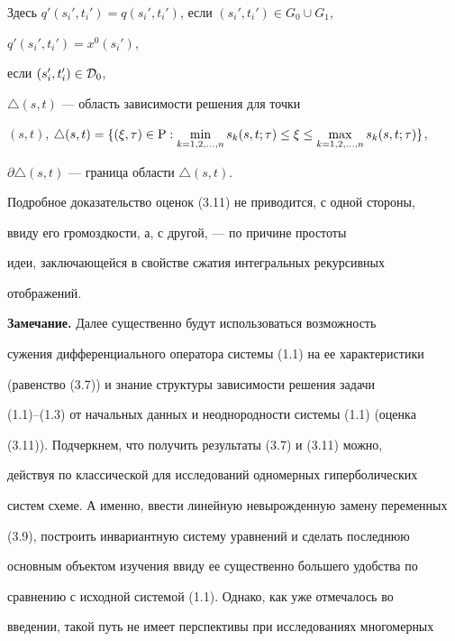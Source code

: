 Здесь $q' (s_{i}',t_{i}') = q(s_{i}',


t_{i}')$, если $(s_{i}',t_{i}') \in G_0 \cup G_1$,


$q' (s_{i}',t_{i}') = x^{0}(s_{i}')$,


если $(s_{i}',t_{i}') \in {\cal D}_0$,


$\triangle (s,t)$ --- область зависимости решения для точки


$(s,t)$, $\triangle (s,t) = \{ (\xi, \tau) \in {\P}:


\min\limits_{k = 1,2,\dotsc,n} s_{k} (s,t; \tau) \leq \xi \leq


\max\limits_{k = 1,2,\dotsc,n} s_{k} (s,t; \tau) \}$,


$\partial \triangle (s,t)$ --- граница области $\triangle (s,t)$.





Подробное доказательство оценок (3.11) не приводится, с одной стороны,


ввиду его громоздкости, а, с другой, --- по причине простоты


идеи, заключающейся в свойстве сжатия интегральных рекурсивных


отображений.


\medskip





{\bf Замечание.} Далее существенно будут использоваться возможность


сужения дифференциального оператора системы (1.1) на ее характеристики


(равенство (3.7)) и знание структуры зависимости решения задачи


(1.1)--(1.3) от начальных данных и неоднородности системы (1.1) (оценка


(3.11)). Подчеркнем, что получить результаты (3.7) и (3.11) можно,


действуя по классической для исследований одномерных гиперболических


систем схеме. А именно, ввести линейную невырожденную замену переменных


(3.9), построить инвариантную систему уравнений и сделать последнюю


основным объектом изучения ввиду ее существенно большего удобства по


сравнению с исходной системой (1.1). Однако, как уже отмечалось во


введении, такой путь не имеет перспективы при исследованиях многомерных


